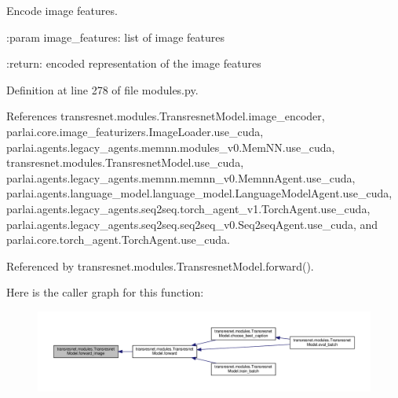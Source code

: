 \begin{DoxyVerb}Encode image features.

:param image_features:
    list of image features

:return:
    encoded representation of the image features
\end{DoxyVerb}
 

Definition at line 278 of file modules.\+py.



References transresnet.\+modules.\+Transresnet\+Model.\+image\+\_\+encoder, parlai.\+core.\+image\+\_\+featurizers.\+Image\+Loader.\+use\+\_\+cuda, parlai.\+agents.\+legacy\+\_\+agents.\+memnn.\+modules\+\_\+v0.\+Mem\+N\+N.\+use\+\_\+cuda, transresnet.\+modules.\+Transresnet\+Model.\+use\+\_\+cuda, parlai.\+agents.\+legacy\+\_\+agents.\+memnn.\+memnn\+\_\+v0.\+Memnn\+Agent.\+use\+\_\+cuda, parlai.\+agents.\+language\+\_\+model.\+language\+\_\+model.\+Language\+Model\+Agent.\+use\+\_\+cuda, parlai.\+agents.\+legacy\+\_\+agents.\+seq2seq.\+torch\+\_\+agent\+\_\+v1.\+Torch\+Agent.\+use\+\_\+cuda, parlai.\+agents.\+legacy\+\_\+agents.\+seq2seq.\+seq2seq\+\_\+v0.\+Seq2seq\+Agent.\+use\+\_\+cuda, and parlai.\+core.\+torch\+\_\+agent.\+Torch\+Agent.\+use\+\_\+cuda.



Referenced by transresnet.\+modules.\+Transresnet\+Model.\+forward().

Here is the caller graph for this function\+:
\nopagebreak
\begin{figure}[H]
\begin{center}
\leavevmode
\includegraphics[width=350pt]{classtransresnet_1_1modules_1_1TransresnetModel_a578be5b044ee4d34d48541fdeb3ee947_icgraph}
\end{center}
\end{figure}
\mbox{\label{classtransresnet_1_1modules_1_1TransresnetModel_aa3f65819701999860b414e1bb6bf74cb}} 
